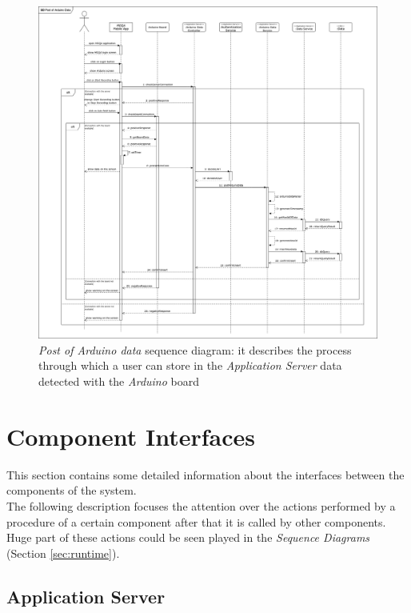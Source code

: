 \begin{figure}[H]
\begin{center}
  \includegraphics[width=\textwidth,keepaspectratio]{img/archi/sequences/data.png}
  \hspace{0.05\linewidth}
  \centering
  \caption{\textit{Post of Arduino data} sequence diagram: it describes the process through which a user can store in the \textit{Application Server} data detected with the \textit{Arduino} board}
  \label{img:archi_sequence2}
\end{center}
\end{figure}
\clearpage

\section{Component Interfaces}
This section contains some detailed information about the interfaces between the components of the system.\\
The following description focuses the attention over the actions performed by a procedure of a certain component after that it is called by other components.\\
Huge part of these actions could be seen played in the \textit{Sequence Diagrams} (Section \ref{sec:runtime}).

\subsection{Application Server}

